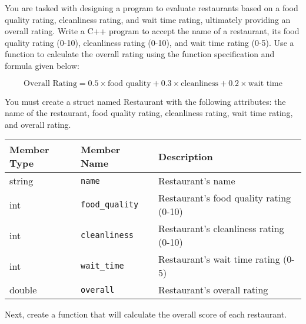 You are tasked with designing a program to evaluate restaurants based on a food quality rating, cleanliness rating, and wait time rating, ultimately providing an overall rating. Write a C++ program to accept the name of a restaurant, its food quality rating (0-10), cleanliness rating (0-10), and wait time rating (0-5). Use a function to calculate the overall rating using the function specification and formula given below:

\begin{equation}
\text{Overall Rating} = 
0.5 \times \text{food quality} + 
0.3 \times \text{cleanliness} + 
0.2 \times \text{wait time}
\end{equation}


You must create a struct named Restaurant with the following attributes: the name of the restaurant, food quality rating, cleanliness rating, wait time rating, and overall rating. 

\begin{center}
\begin{tabular}{|l|l|l|}
    \hline
    \textbf{Member Type} & \textbf{Member Name} & \textbf{Description} \\ \hline
    \textbf{}{string} & \texttt{name} & Restaurant's name \\ \hline
    \textbf{}{int} & \texttt{food\_quality} & Restaurant's food quality rating (0-10) \\ \hline
    \textbf{}{int} & \texttt{cleanliness} & Restaurant's cleanliness rating (0-10) \\ \hline
    \textbf{}{int} & \texttt{wait\_time} & Restaurant's wait time rating (0-5) \\ \hline
    \textbf{}{double} & \texttt{overall} & Restaurant's overall rating \\ \hline
\end{tabular}
\end{center}

Next, create a function that will calculate the overall score of each restaurant. 

\newpage

